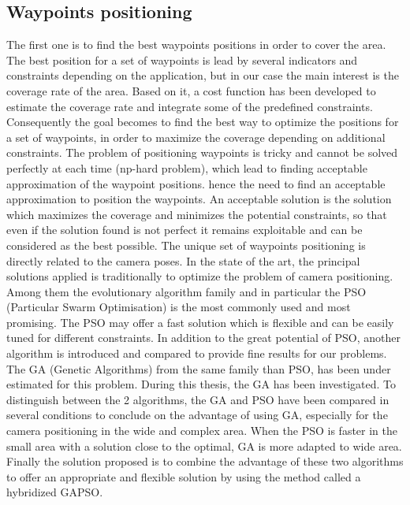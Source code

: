 \subsection{Waypoints positioning}
The first one is to find the best waypoints positions in order to cover the area. 
The best position for a set of waypoints is lead by several indicators and constraints depending on the application, but in our case the main interest is the coverage rate of the area. Based on it, a cost function has been developed to estimate the coverage rate and integrate some of the predefined constraints.\\
Consequently the goal becomes to find the best way to optimize the positions for a set of waypoints, in order to maximize the coverage depending on additional constraints. The problem of positioning waypoints is tricky and cannot be solved perfectly at each time (np-hard problem),  which lead to finding acceptable approximation of the waypoint positions.
hence the need to find an acceptable approximation to position the waypoints. 
An acceptable solution is the solution which maximizes the coverage and minimizes the potential constraints, so that even if the solution found is not perfect it remains exploitable and can be considered as the best possible.
The unique set of waypoints positioning is directly related to the camera poses. In the state of the art, the principal solutions applied is traditionally to optimize the problem of camera positioning.\\ 
Among them the evolutionary algorithm family and in particular the PSO (Particular Swarm Optimisation) is the most commonly used and most promising.
 The PSO may offer a fast solution which is flexible and  can be easily tuned for different constraints.
  In addition  to the great potential of PSO, another algorithm is introduced and compared to provide fine results for our problems.
The GA (Genetic Algorithms) from the same family than PSO, has been under estimated for this problem. During this thesis, the GA has been investigated. 
To distinguish between the 2 algorithms, the GA and PSO have been compared in several conditions to conclude on the advantage of using GA, especially for the camera positioning in the wide and complex area. When the PSO is faster in the small area with a solution close to the optimal, GA is more adapted to wide area.
Finally the solution proposed is to combine the advantage of these two algorithms to offer an appropriate and flexible solution by using the method called a hybridized GAPSO. 


